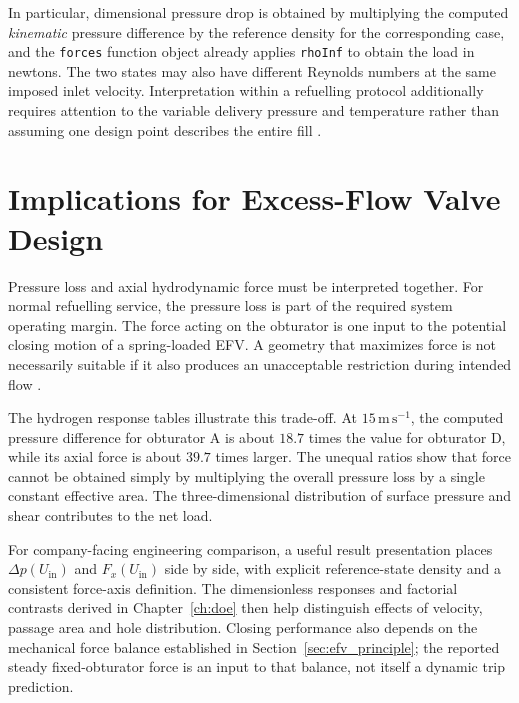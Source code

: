 In particular, dimensional pressure drop is obtained by multiplying the computed \emph{kinematic} pressure difference by the reference density for the corresponding case, and the \texttt{forces} function object already applies \texttt{rhoInf} to obtain the load in newtons. The two states may also have different Reynolds numbers at the same imposed inlet velocity. Interpretation within a refuelling protocol additionally requires attention to the variable delivery pressure and temperature rather than assuming one design point describes the entire fill \cite{sae_j2601,elgowainy2017}.

\section{Implications for Excess-Flow Valve Design}
\label{sec:results_efv_implications}

Pressure loss and axial hydrodynamic force must be interpreted together. For normal refuelling service, the pressure loss is part of the required system operating margin. The force acting on the obturator is one input to the potential closing motion of a spring-loaded EFV. A geometry that maximizes force is not necessarily suitable if it also produces an unacceptable restriction during intended flow \cite{white2016,crane410}.

The hydrogen response tables illustrate this trade-off. At $15\,\mathrm{m\,s^{-1}}$, the computed pressure difference for obturator A is about $18.7$ times the value for obturator D, while its axial force is about $39.7$ times larger. The unequal ratios show that force cannot be obtained simply by multiplying the overall pressure loss by a single constant effective area. The three-dimensional distribution of surface pressure and shear contributes to the net load.

For company-facing engineering comparison, a useful result presentation places $\Delta p(U_{\mathrm{in}})$ and $F_x(U_{\mathrm{in}})$ side by side, with explicit reference-state density and a consistent force-axis definition. The dimensionless responses and factorial contrasts derived in Chapter~\ref{ch:doe} then help distinguish effects of velocity, passage area and hole distribution. Closing performance also depends on the mechanical force balance established in Section~\ref{sec:efv_principle}; the reported steady fixed-obturator force is an input to that balance, not itself a dynamic trip prediction.
